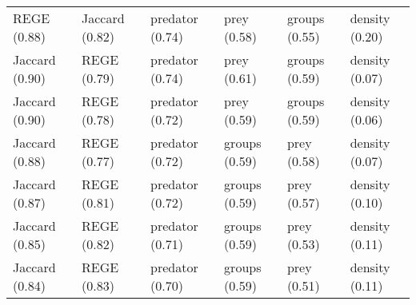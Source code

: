 \begin{table}[ht]
\begin{tabular}{llllll}
  REGE (0.88) & Jaccard (0.82) & predator (0.74) & prey (0.58) & groups (0.55) & density (0.20) \\ 
  Jaccard (0.90) & REGE (0.79) & predator (0.74) & prey (0.61) & groups (0.59) & density (0.07) \\ 
  Jaccard (0.90) & REGE (0.78) & predator (0.72) & prey (0.59) & groups (0.59) & density (0.06) \\ 
  Jaccard (0.88) & REGE (0.77) & predator (0.72) & groups (0.59) & prey (0.58) & density (0.07) \\ 
  Jaccard (0.87) & REGE (0.81) & predator (0.72) & groups (0.59) & prey (0.57) & density (0.10) \\ 
  Jaccard (0.85) & REGE (0.82) & predator (0.71) & groups (0.59) & prey (0.53) & density (0.11) \\ 
  Jaccard (0.84) & REGE (0.83) & predator (0.70) & groups (0.59) & prey (0.51) & density (0.11) \\ 
   \hline
\end{tabular}
\end{table}
